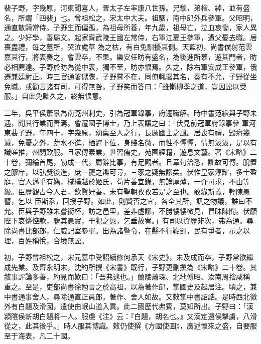 
\begin{pinyinscope}

 裴子野，字幾原，河東聞喜人，晉太子左率康八世孫。兄黎，弟楷、綽，並有盛名，所謂「四裴」也。曾祖松之，宋太中大夫。祖駰，南中郎外兵參軍。父昭明，通直散騎常侍。子野生而偏孤，為祖母所養，年九歲，祖母亡，泣血哀慟，家人異之。少好學，善屬文。起家齊武陵王國左常侍，右軍江夏王參軍，遭父憂去職。居喪盡禮，每之墓所，哭泣處草
 為之枯，有白兔馴擾其側。天監初，尚書僕射范雲嘉其行，將表奏之，會雲卒，不果。樂安任昉有盛名，為後進所慕，遊其門者，昉必相薦達。子野於昉為從中表，獨不至，昉亦恨焉。久之，除右軍安成王參軍，俄遷兼廷尉正。時三官通署獄牒，子野嘗不在，同僚輒署其名，奏有不允，子野從坐免職。或勸言諸有司，可得無咎。子野笑而答曰：「雖慚柳季之道，豈因訟以受服。」自此免黜久之，終無恨意。



 二年，吳平侯蕭景為南兗州刺史，引為冠軍錄事，府遷職解。時中書范縝與子野未遇，聞其行業而善焉。會遷國子博士，乃上表讓之曰：「伏見前冠軍府錄事參
 軍河東裴子野，年四十，字幾原，幼稟至人之行，長厲國士之風。居喪有禮，毀瘠幾滅，免憂之外，蔬水不進。栖遲下位，身賤名微，而性不憛憛，情無汲汲，是以有識嗟推，州閭歎服。且家傳素業，世習儒史，苑囿經籍，遊息文藝。著《宋略》二十卷，彌綸首尾，勒成一代，屬辭比事，有足觀者。且章句洽悉，訓故可傳。脫置之膠庠，以弘獎後進，庶一夔之辯可尋，三豕之疑無謬矣。伏惟皇家淳耀，多士盈庭，官人邁乎有媯，棫樸越於姬氏，茍片善宜錄，無論厚薄，一介可求，不由等級。臣歷觀古今人君，欽賢好善，未有聖朝孜孜若是之至也。敢緣斯義，輕陳愚瞽，乞以
 臣斯忝，回授子野。如此，則賢否之宜，各全其所，訊之物議，誰曰不允。臣與子野雖未嘗銜杯，訪之邑里，差非虛謬，不勝慺慺微見，冒昧陳聞。伏願陛下哀憐悾款，鑒其愚實，干犯之愆，乞垂赦宥。」有司以資歷非次，弗為通。尋除尚書比部郎，仁威記室參軍。出為諸暨令，在縣不行鞭罰，民有爭者，示之以理，百姓稱悅，合境無訟。



 初，子野曾祖松之，宋元嘉中受詔續修何承天《宋史》，未及成而卒，子野常欲繼成先業。及齊永明末，沈約所撰《宋書》既行，子野更刪撰為《宋略》二十卷。其敘事評論多善，約見而歎曰：「吾弗逮也。」蘭陵蕭琛、北地傅昭、汝南周捨咸稱
 重之。至是，吏部尚書徐勉言之於高祖，以為著作郎，掌國史及起居注。頃之，兼中書通事舍人，尋除通直正員郎，著作、舍人如故。又敕掌中書詔誥。是時西北徼外有白題及滑國，遣使由岷山道入貢。此二國歷代弗賓，莫知所出。子野曰：「漢潁陰侯斬胡白題將一人。服虔《注》云：『白題，胡名也。』又漢定遠侯擊虜，八滑從之，此其後乎。」時人服其博識。敕仍使撰《方國使圖》，廣述懷來之盛，自要服至于海表，凡二十國。




\end{pinyinscope}
